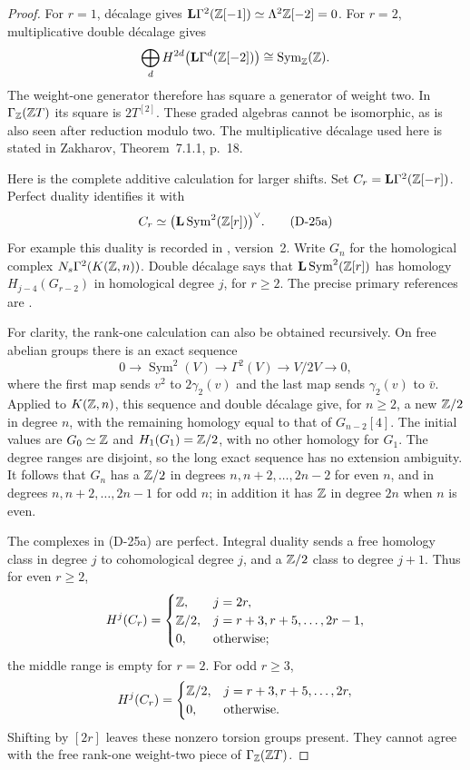 \begin{proof}
For $r=1$, d\'ecalage gives
$\mathbf L\Gamma^2(\mathbb Z[-1])\simeq\Lambda^2\mathbb Z[-2]=0$.
For $r=2$, multiplicative double d\'ecalage gives
\[
 \bigoplus_d H^{2d}\bigl(\mathbf L\Gamma^d(\mathbb Z[-2])\bigr)
   \cong\operatorname{Sym}_{\mathbb Z}(\mathbb Z).
\]
The weight-one generator therefore has square a generator of
weight two. In $\Gamma_{\mathbb Z}(\mathbb Z T)$ its square is $2T^{[2]}$.
These graded algebras cannot be isomorphic, as is also seen after
reduction modulo two. The multiplicative d\'ecalage used here is
stated in Zakharov, Theorem~7.1.1, p.~18.

Here is the complete additive calculation for larger shifts. Set
$C_r=\mathbf L\Gamma^2(\mathbb Z[-r])$. Perfect duality identifies it with
\[
 C_r\simeq
 \bigl(\mathbf L\operatorname{Sym}^2(\mathbb Z[r])\bigr)^\vee.
 \tag{D-25a}
\]
For example this duality is recorded in
\cite[Remark~2.70]{A_KSZ}, version~2.
Write $G_n$ for the homological complex
$N_s\Gamma^2(K(\mathbb Z,n))$. Double d\'ecalage says that
$\mathbf L\operatorname{Sym}^2(\mathbb Z[r])$ has homology
$H_{j-4}(G_{r-2})$ in homological degree $j$, for $r\ge2$.
The precise primary references are
\cite[Proposition~3.5, equation~(3-9), p.~270; Proposition~8.7,
equation~(8-16), p.~306]{D_BMT2016}.

For clarity, the rank-one calculation can also be obtained
recursively. On free abelian groups there is an exact sequence
\[
 0\longrightarrow\operatorname{Sym}^2(V)
 \longrightarrow\Gamma^2(V)
 \longrightarrow V/2V\longrightarrow0,
\]
where the first map sends $v^2$ to $2\gamma_2(v)$ and the last
map sends $\gamma_2(v)$ to $\bar v$. Applied to $K(\mathbb Z,n)$,
this sequence and double d\'ecalage give, for $n\ge2$, a new
$\mathbb Z/2$ in degree $n$, with the remaining homology equal to that
of $G_{n-2}[4]$. The initial values are $G_0\simeq\mathbb Z$ and
$H_1(G_1)=\mathbb Z/2$, with no other homology for $G_1$.
The degree ranges are disjoint, so the long exact sequence has no
extension ambiguity. It follows that $G_n$ has a $\mathbb Z/2$ in
degrees $n,n+2,\ldots,2n-2$ for even $n$, and in degrees
$n,n+2,\ldots,2n-1$ for odd $n$; in addition it has $\mathbb Z$ in
degree $2n$ when $n$ is even.

The complexes in (D-25a) are perfect. Integral duality sends a
free homology class in degree $j$ to cohomological degree $j$,
and a $\mathbb Z/2$ class to degree $j+1$. Thus for even $r\ge2$,
\[
 H^j(C_r)=
 \begin{cases}
 \mathbb Z,&j=2r,\\
 \mathbb Z/2,&j=r+3,r+5,\ldots,2r-1,\\
 0,&\text{otherwise};
 \end{cases}
\]
the middle range is empty for $r=2$. For odd $r\ge3$,
\[
 H^j(C_r)=
 \begin{cases}
 \mathbb Z/2,&j=r+3,r+5,\ldots,2r,\\
 0,&\text{otherwise}.
 \end{cases}
\]
Shifting by $[2r]$ leaves these nonzero torsion groups present.
They cannot agree with the free rank-one weight-two piece of
$\Gamma_{\mathbb Z}(\mathbb Z T)$.
\end{proof}

